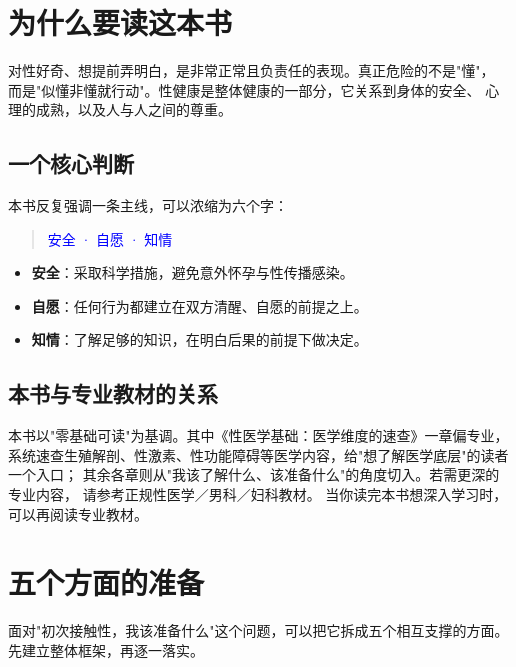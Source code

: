 \documentclass[12pt,UTF8,openany]{ctexbook}
\begin{document}
\tableofcontents
\clearpage
\chapter{为什么要读这本书}

对性好奇、想提前弄明白，是非常正常且负责任的表现。真正危险的不是"懂"，
而是"似懂非懂就行动"。性健康是整体健康的一部分，它关系到身体的安全、
心理的成熟，以及人与人之间的尊重。

\section{一个核心判断}

本书反复强调一条主线，可以浓缩为六个字：

\begin{quote}
\centering \myhei{}\textcolor{blue}{安全 · 自愿 · 知情}
\end{quote}

\begin{itemize}
  \item \textbf{安全}：采取科学措施，避免意外怀孕与性传播感染。
  \item \textbf{自愿}：任何行为都建立在双方清醒、自愿的前提之上。
  \item \textbf{知情}：了解足够的知识，在明白后果的前提下做决定。
\end{itemize}

\section{本书与专业教材的关系}

本书以"零基础可读"为基调。其中《性医学基础：医学维度的速查》一章偏专业，
系统速查生殖解剖、性激素、性功能障碍等医学内容，给"想了解医学底层"的读者一个入口；
其余各章则从"我该了解什么、该准备什么"的角度切入。若需更深的专业内容，
请参考正规性医学／男科／妇科教材。
当你读完本书想深入学习时，可以再阅读专业教材。

\chapter{五个方面的准备}

面对"初次接触性，我该准备什么"这个问题，可以把它拆成五个相互支撑的方面。
先建立整体框架，再逐一落实。
\end{document}
